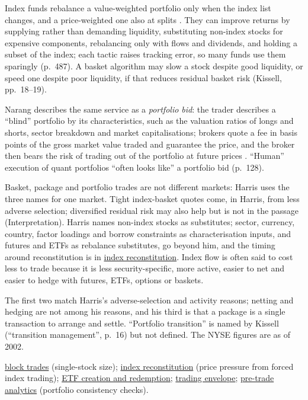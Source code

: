 \begin{qfdefinition}
 Index funds rebalance a value-weighted portfolio only when the index list changes, and a price-weighted one also at splits \citep[same chap., sec.~23.2, p.~486]{alpha-harris}. They can improve returns by supplying rather than demanding liquidity, substituting non-index stocks for expensive components, rebalancing only with flows and dividends, and holding a subset of the index; each tactic raises tracking error, so many funds use them sparingly (p.~487). A basket algorithm may slow a stock despite good liquidity, or speed one despite poor liquidity, if that reduces residual basket risk (Kissell, pp.~18--19).

Narang describes the same service as a \emph{portfolio bid}: the trader describes a ``blind'' portfolio by its characteristics, such as the valuation ratios of longs and shorts, sector breakdown and market capitalisations; brokers quote a fee in basis points of the gross market value traded and guarantee the price, and the broker then bears the risk of trading out of the portfolio at future prices \citep[chap.~7, ``Execution'', p.~128]{s7-narang}. ``Human'' execution of quant portfolios ``often looks like'' a portfolio bid (p.~128).

 Basket, package and portfolio trades are not different markets: Harris uses the three names for one market. Tight index-basket quotes come, in Harris, from less adverse selection; diversified residual risk may also help but is not in the passage (Interpretation). Harris names non-index stocks as substitutes; sector, currency, country, factor loadings and borrow constraints as characterisation inputs, and futures and ETFs as rebalance substitutes, go beyond him, and the timing around reconstitution is in \hyperref[ev:index-reconstitution-impact]{index reconstitution}. Index flow is often said to cost less to trade because it is less security-specific, more active, easier to net and easier to hedge with futures, ETFs, options or baskets.

The first two match Harris's adverse-selection and activity reasons; netting and hedging are not among his reasons, and his third is that a package is a single transaction to arrange and settle. ``Portfolio transition'' is named by Kissell (``transition management'', p.~16) but not defined. The NYSE figures are as of 2002.

 \hyperref[def:block-trade]{block trades} (single-stock size); \hyperref[ev:index-reconstitution-impact]{index reconstitution} (price pressure from forced index trading); \hyperref[mech:etf-creation-redemption]{ETF creation and redemption}; \hyperref[def:trading-envelope]{trading envelope}; \hyperref[meth:execution-decision-support]{pre-trade analytics} (portfolio consistency checks).

\end{qfdefinition}

